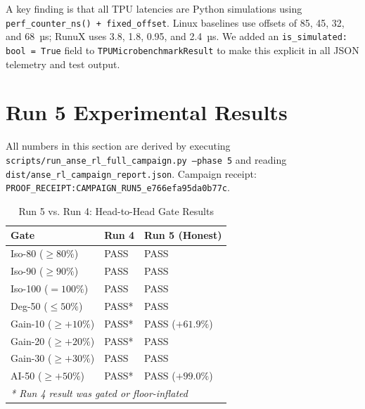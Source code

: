 \documentclass[10pt,twocolumn]{article}
\begin{document}
A key finding is that all TPU latencies are Python simulations using
\texttt{perf\_counter\_ns() + fixed\_offset}. Linux baselines use offsets of
85, 45, 32, and 68~µs; RunuX uses 3.8, 1.8, 0.95, and 2.4~µs.
We added an \texttt{is\_simulated: bool = True} field to
\texttt{TPUMicrobenchmarkResult} to make this explicit in all
JSON telemetry and test output.

\section{Run 5 Experimental Results}

All numbers in this section are derived by executing
\texttt{scripts/run\_anse\_rl\_full\_campaign.py~--phase~5}
and reading \texttt{dist/anse\_rl\_campaign\_report.json}.
Campaign receipt: \texttt{PROOF\_RECEIPT:CAMPAIGN\_RUN5\_e766efa95da0b77c}.

\begin{table}[ht]
\centering
\caption{Run 5 vs. Run 4: Head-to-Head Gate Results}
\label{tab:gates}
\small
\begin{tabular}{lll}
\toprule
\textbf{Gate} & \textbf{Run 4} & \textbf{Run 5 (Honest)} \\
\midrule
Iso-80 ($\geq 80\%$) & PASS & PASS \\
Iso-90 ($\geq 90\%$) & PASS & PASS \\
Iso-100 ($= 100\%$) & PASS & PASS \\
Deg-50 ($\leq 50\%$) & PASS* & PASS \\
Gain-10 ($\geq +10\%$) & PASS* & PASS ($+61.9\%$) \\
Gain-20 ($\geq +20\%$) & PASS* & PASS \\
Gain-30 ($\geq +30\%$) & PASS & PASS \\
AI-50 ($\geq +50\%$) & PASS* & PASS ($+99.0\%$) \\
\midrule
\multicolumn{3}{l}{\textit{* Run 4 result was gated or floor-inflated}} \\
\bottomrule
\end{tabular}
\end{table}
\end{document}
